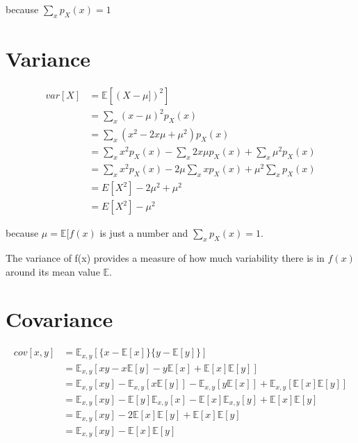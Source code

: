 because $\sum_x p_X(x) = 1$

\section{Variance}

\begin{equation}
    \begin{split}
        var[X] & = \mathbb{E}[(X - \mu])^2]\\
        & = \sum_x (x - \mu)^2p_X(x)\\
        & = \sum_x(x^2 -2x\mu + \mu^2)p_X(x)\\
        & = \sum_xx^2p_X(x) - \sum_x 2x \mu p_X(x) + \sum_x \mu^2p_X(x)\\
        & = \sum_xx^2p_X(x) - 2\mu \sum_x x p_X(x) + \mu^2\sum_x p_X(x)\\
        & = E[X^2] - 2\mu^2 + \mu^2\\
        & = E[X^2] - \mu^2
    \end{split}
\end{equation}

because $\mu = \mathbb{E}[f(x)$ is just a number and $\sum_x p_X(x) = 1$.

The variance of f(x) provides a measure of how much variability there is in $f(x)$ around its mean value $\mathbb{E}$.

\section{Covariance}
\begin{equation}
    \begin{split}
        cov[x, y] & = \mathbb{E}_{x, y}[\{x - \mathbb{E}[x]\}\{y - \mathbb{E}[y]\}]\\
        & = \mathbb{E}_{x, y}[xy - x\mathbb{E}[y] - y\mathbb{E}[x] + \mathbb{E}[x]\mathbb{E}[y]]\\
        & = \mathbb{E}_{x, y}[xy] - \mathbb{E}_{x, y}[x\mathbb{E}[y]] - \mathbb{E}_{x, y}[y\mathbb{E}[x]] +  \mathbb{E}_{x, y}[\mathbb{E}[x]\mathbb{E}[y]]\\
        & = \mathbb{E}_{x, y}[xy] - \mathbb{E}[y]\mathbb{E}_{x, y}[x] - \mathbb{E}[x]\mathbb{E}_{x, y}[y] + \mathbb{E}[x]\mathbb{E}[y]\\
        & = \mathbb{E}_{x, y}[xy] - 2\mathbb{E}[x]\mathbb{E}[y] + \mathbb{E}[x]\mathbb{E}[y]\\
        & = \mathbb{E}_{x, y}[xy] - \mathbb{E}[x]\mathbb{E}[y]
    \end{split}
\end{equation}


